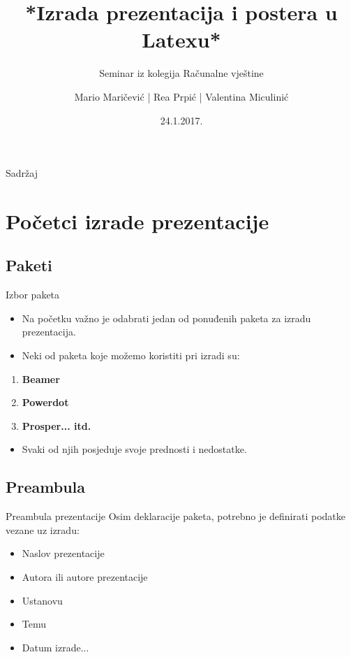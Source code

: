 \documentclass{beamer}
\author[Maričević, Prpić, Miculinić]{Mario Maričević | Rea Prpić | Valentina Miculinić}
\title{*Izrada prezentacija i postera u Latexu*}
\subtitle{Seminar iz kolegija Računalne vještine}
\institute{Tehnički fakultet,Rijeka}
\date{24.1.2017.}
\begin{document}
\begin{frame}
\titlepage
\end{frame}
\begin{frame}{Sadržaj}
\tableofcontents
\end{frame}

\section{Početci izrade prezentacije}
\subsection{Paketi}

\begin{frame}{Izbor paketa}
\begin{itemize}
	\item Na početku važno je odabrati jedan od ponuđenih paketa za izradu prezentacija.
	\item Neki od paketa koje možemo koristiti pri izradi su:
\end{itemize}
\begin{enumerate}
	\item \textbf{Beamer} 
	\item \textbf{Powerdot} 
	\item \textbf{Prosper... itd.}
\end{enumerate}
\begin{itemize}
	\item Svaki od njih posjeduje svoje prednosti i nedostatke.
\end{itemize}
\end{frame}

\subsection{Preambula}

\begin{frame}{Preambula prezentacije}
Osim deklaracije paketa, potrebno je definirati podatke vezane uz izradu:
\begin{itemize}
	\item Naslov prezentacije \pause
	\item Autora ili autore prezentacije \pause
	\item Ustanovu \pause
	\item Temu \pause
	\item Datum izrade...
\end{itemize} 
\end{frame}
\end{document}

